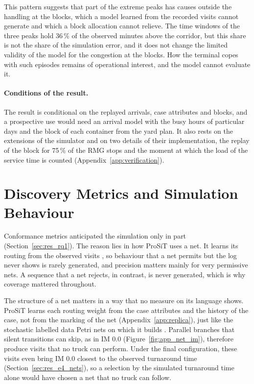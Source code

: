 This pattern suggests that part of the extreme peaks has causes outside the handling
at the blocks, which a model learned from the recorded visits cannot generate and
which a block allocation cannot relieve. The time windows of the three peaks hold
36\,\% of the observed
minutes above the corridor, but this share is not the share of the simulation error,
and it does not change the limited validity of the model for the congestion at the
blocks. How the terminal copes with such episodes remains of operational interest,
and the model cannot evaluate it.

\paragraph{Conditions of the result.} The result is conditional on the replayed
arrivals, case attributes and blocks, and a prospective use would need an arrival
model with the busy hours of particular days and the block of each container from the
yard plan. It also
rests on the extensions of the simulator and on two details of their implementation,
the replay of the block for 75\,\% of the RMG stops and the moment at which the load of
the service time is counted (Appendix~\ref{app:verification}).

\section{Discovery Metrics and Simulation Behaviour}
\label{sec:disc_metrics}

Conformance metrics anticipated the simulation only in part
(Section~\ref{sec:res_rq1}). The reason lies in how ProSiT uses a net. It learns its
routing from the observed visits \cite{Vinci2026prosit}, so behaviour that a net
permits but the log never shows is rarely generated, and precision matters mainly for
very permissive nets. A sequence that a net rejects, in contrast, is never generated,
which is why coverage mattered throughout.

The structure of a net matters in a way that no measure on its language shows. ProSiT
learns each routing weight from the case attributes and the history of the case, not
from the marking of the net (Appendix~\ref{app:replica}), just like the stochastic labelled
data Petri nets on which it builds
\cite{mannhardt2023stochasticProcessesModelling,Vinci2023Inf.Activ.Prob}. Parallel
branches that silent transitions can skip, as in IM 0.0 (Figure~\ref{fig:app_net_im}), therefore produce visits that
no truck can perform. Under the final configuration, these visits even bring IM 0.0
closest to the observed turnaround time (Section~\ref{sec:res_e4_nets}), so a selection
by the simulated turnaround time alone would have chosen a net that no truck can
follow.

